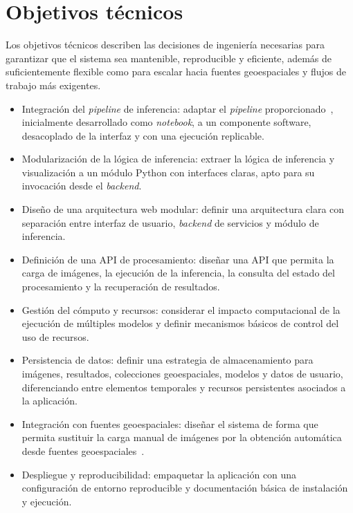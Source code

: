 \section{Objetivos técnicos}

Los objetivos técnicos describen las decisiones de ingeniería necesarias para garantizar que el sistema sea mantenible, reproducible y eficiente, además de suficientemente flexible como para escalar hacia fuentes geoespaciales y flujos de trabajo más exigentes.

\begin{itemize}
	\item Integración del \textit{pipeline} de inferencia: 
	adaptar el \textit{pipeline} proporcionado~\cite{diezpastora2025trails}, inicialmente desarrollado como \textit{notebook}, a un componente software, desacoplado de la interfaz y con una ejecución replicable.
	
	\item Modularización de la lógica de inferencia: extraer la lógica de inferencia y visualización a un módulo Python con interfaces claras, apto para su invocación desde el \textit{backend}.
	
	\item Diseño de una arquitectura web modular: definir una arquitectura clara con separación entre interfaz de usuario, \textit{backend} de servicios y módulo de inferencia.
	
	\item Definición de una API de procesamiento: diseñar una API que permita la carga de imágenes, la ejecución de la inferencia, la consulta del estado del procesamiento y la recuperación de resultados.
	
	\item Gestión del cómputo y recursos: considerar el impacto computacional de la ejecución de múltiples modelos y definir mecanismos básicos de control del uso de recursos.
	
	\item Persistencia de datos: definir una estrategia de almacenamiento para imágenes, resultados, colecciones geoespaciales, modelos y datos de usuario, diferenciando entre elementos temporales y recursos persistentes asociados a la aplicación.
	
	\item Integración con fuentes geoespaciales: diseñar el sistema de forma que permita sustituir la carga manual de imágenes por la obtención automática desde fuentes geoespaciales~\cite{osm_web, leaflet_web}.
	
	\item Despliegue y reproducibilidad: empaquetar la aplicación con una configuración de entorno reproducible y documentación básica de instalación y ejecución.

\end{itemize}